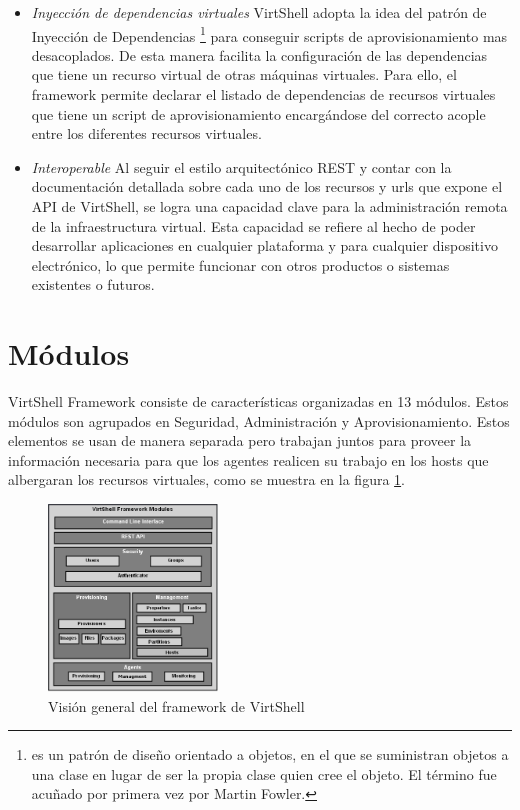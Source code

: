 \documentclass[conference, spanish]{IEEEtran}
\begin{document}
\begin{itemize}
\item \emph{Inyección de dependencias virtuales} VirtShell adopta la idea del patrón de Inyección de Dependencias \footnote{es un patrón de diseño orientado a objetos, en el que se suministran objetos a una clase en lugar de ser la propia clase quien cree el objeto. El término fue acuñado por primera vez por Martin Fowler.} \cite{fowler04} para conseguir scripts de aprovisionamiento mas desacoplados. De esta manera facilita la configuración de las dependencias que tiene un recurso virtual de otras máquinas virtuales. Para ello, el framework permite declarar el listado de dependencias de recursos virtuales que tiene un script de aprovisionamiento encargándose del correcto acople entre los diferentes recursos virtuales.
\item \emph{Interoperable} Al seguir el estilo arquitectónico REST y contar con la documentación detallada sobre cada uno de los recursos y urls que expone el API de VirtShell, se logra una capacidad clave para la administración remota de la infraestructura virtual. Esta capacidad se refiere al hecho de poder desarrollar aplicaciones en cualquier plataforma y para cualquier dispositivo electrónico, lo que permite funcionar con otros productos o sistemas existentes o futuros.

\end{itemize}

\section{Módulos}
VirtShell Framework consiste de características organizadas en 13 módulos. Estos módulos son agrupados en Seguridad, Administración y Aprovisionamiento. Estos elementos se usan de manera separada pero trabajan juntos para proveer la información necesaria para que los agentes realicen su trabajo en los hosts que albergaran los recursos virtuales, como se muestra en la figura \ref{fig:framework}. \\

\begin{figure}[h]
  \centering
  \includegraphics[width = 0.4\textwidth]{../architecture/v1/diagrams/framework}
  \caption{Visión general del framework de VirtShell}
  \label{fig:framework}
\end{figure}
\end{document}
